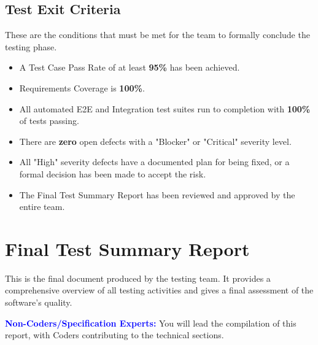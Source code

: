 \documentclass{article}
\newcommand{\role}[1]{\textbf{\textcolor{blue}{#1:}}}
\begin{document}
\subsection{Test Exit Criteria}
These are the conditions that must be met for the team to formally conclude the testing phase.
\begin{itemize}
    \item A Test Case Pass Rate of at least \textbf{95\%} has been achieved.
    \item Requirements Coverage is \textbf{100\%}.
    \item All automated E2E and Integration test suites run to completion with \textbf{100\%} of tests passing.
    \item There are \textbf{zero} open defects with a "Blocker" or "Critical" severity level.
    \item All "High" severity defects have a documented plan for being fixed, or a formal decision has been made to accept the risk.
    \item The Final Test Summary Report has been reviewed and approved by the entire team.
\end{itemize}

\section{Final Test Summary Report}
This is the final document produced by the testing team. It provides a comprehensive overview of all testing activities and gives a final assessment of the software's quality.

\role{Non-Coders/Specification Experts}
You will lead the compilation of this report, with Coders contributing to the technical sections.
\end{document}
